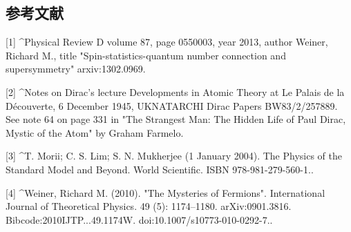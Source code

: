 \subsection{参考文献}
[1]
^Physical Review D volume 87, page 0550003, year 2013, author Weiner, Richard M., title "Spin-statistics-quantum number connection and supersymmetry" arxiv:1302.0969.

[2]
^Notes on Dirac's lecture Developments in Atomic Theory at Le Palais de la Découverte, 6 December 1945, UKNATARCHI Dirac Papers BW83/2/257889. See note 64 on page 331 in "The Strangest Man: The Hidden Life of Paul Dirac, Mystic of the Atom" by Graham Farmelo.

[3]
^T. Morii; C. S. Lim; S. N. Mukherjee (1 January 2004). The Physics of the Standard Model and Beyond. World Scientific. ISBN 978-981-279-560-1..

[4]
^Weiner, Richard M. (2010). "The Mysteries of Fermions". International Journal of Theoretical Physics. 49 (5): 1174–1180. arXiv:0901.3816. Bibcode:2010IJTP...49.1174W. doi:10.1007/s10773-010-0292-7..


















